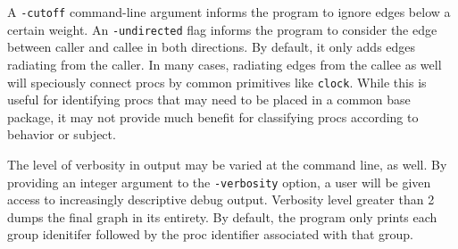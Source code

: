 \documentclass{article}[letter,10pt]
\begin{document}
{{    A \texttt{-cutoff} command-line argument informs the program to ignore edges below a certain weight.
    An \texttt{-undirected} flag informs the program to consider the edge between caller and callee in both
    directions. By default, it only adds edges radiating from the caller. In many cases, radiating edges from
    the callee as well will speciously connect procs by common primitives like \texttt{clock}. While this is useful
    for identifying procs that may need to be placed in a common base package, it may not provide much benefit
    for classifying procs according to behavior or subject.

    The level of verbosity in output may be varied at the command line, as well. By providing an integer argument
    to the \texttt{-verbosity} option, a user will be given access to increasingly descriptive debug output.
    Verbosity level greater than 2 dumps the final graph in its entirety. By default, the program only prints
    each group idenitifer followed by the proc identifier associated with that group.
  }
}
\end{document}
